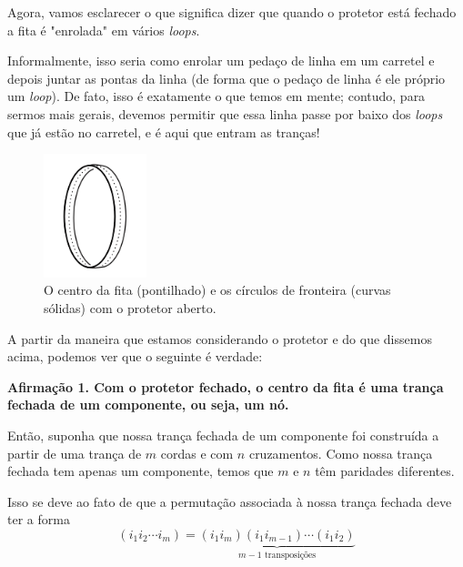 	\par\vspace{0.3cm} Agora, vamos esclarecer o que significa dizer que quando o protetor está fechado a fita é "enrolada" em vários \textit{loops}.
	\par\vspace{0.3cm} Informalmente, isso seria como enrolar um pedaço de linha em um carretel e depois juntar as pontas da linha (de forma que o pedaço de linha é ele próprio um \textit{loop}). De fato, isso é exatamente o que temos em mente; contudo, para sermos mais gerais, devemos permitir que essa linha passe por baixo dos \textit{loops} que já estão no carretel, e é aqui que entram as tranças! 
	\begin{figure}[H]
		\begin{center}
			\includegraphics[width=3cm]{Images/fita.png}
		\end{center}\caption{O centro da fita (pontilhado) e os círculos de fronteira (curvas sólidas) com o protetor aberto.}
	\end{figure}
	\par\vspace{0.3cm} A partir da maneira que estamos considerando o protetor e do que dissemos acima, podemos ver que o seguinte é verdade:
	\begin{center}
		\textbf{Afirmação 1. Com o protetor fechado, o centro da fita é uma trança fechada de um componente, ou seja, um nó.}
	\end{center}
	\par\vspace{0.3cm} Então, suponha que nossa trança fechada de um componente foi construída a partir de uma trança de $m$ cordas e com $n$ cruzamentos. Como nossa trança fechada tem apenas um componente, temos que $m$ e $n$ têm paridades diferentes.
	\par\vspace{0.3cm} Isso se deve ao fato de que a permutação associada à nossa trança fechada deve ter a forma
	\begin{equation*}
	(i_1i_2\cdots i_m) = \underbrace{(i_1i_m)(i_1i_{m-1})\cdots(i_1i_2)}_{m-1\text{ transposições}}
	\end{equation*}

